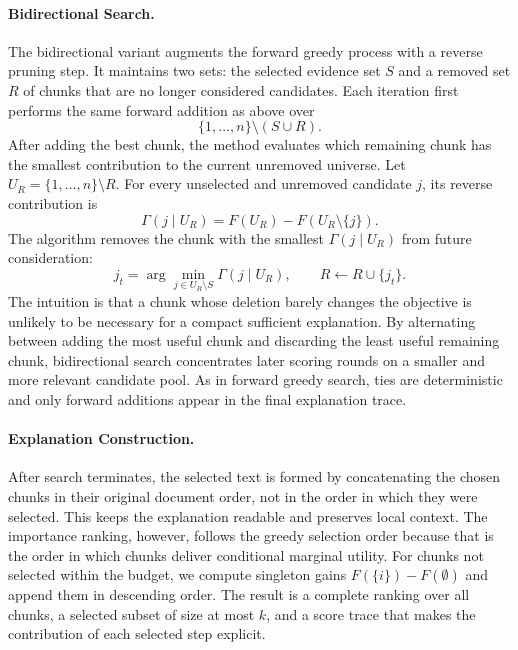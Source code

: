 \paragraph{Bidirectional Search.}
The bidirectional variant augments the forward greedy process with a reverse
pruning step.  It maintains two sets: the selected evidence set $S$ and a
removed set $R$ of chunks that are no longer considered candidates.  Each
iteration first performs the same forward addition as above over
\[
    \{1,\ldots,n\}\setminus(S\cup R).
\]
After adding the best chunk, the method evaluates which remaining chunk has the
smallest contribution to the current unremoved universe.  Let
$U_R=\{1,\ldots,n\}\setminus R$.  For every unselected and unremoved candidate
$j$, its reverse contribution is
\[
    \Gamma(j\mid U_R)=F(U_R)-F(U_R\setminus\{j\}).
\]
The algorithm removes the chunk with the smallest $\Gamma(j\mid U_R)$ from
future consideration:
\[
    j_t=\arg\min_{j\in U_R\setminus S}\Gamma(j\mid U_R),
    \qquad
    R \leftarrow R\cup\{j_t\}.
\]
The intuition is that a chunk whose deletion barely changes the objective is
unlikely to be necessary for a compact sufficient explanation.  By alternating
between adding the most useful chunk and discarding the least useful remaining
chunk, bidirectional search concentrates later scoring rounds on a smaller and
more relevant candidate pool.  As in forward greedy search, ties are
deterministic and only forward additions appear in the final explanation trace.

\paragraph{Explanation Construction.}
After search terminates, the selected text is formed by concatenating the chosen
chunks in their original document order, not in the order in which they were
selected.  This keeps the explanation readable and preserves local context.  The
importance ranking, however, follows the greedy selection order because that is
the order in which chunks deliver conditional marginal utility.  For chunks not
selected within the budget, we compute singleton gains
$F(\{i\})-F(\emptyset)$ and append them in descending order.  The result is a
complete ranking over all chunks, a selected subset of size at most $k$, and a
score trace that makes the contribution of each selected step explicit.
